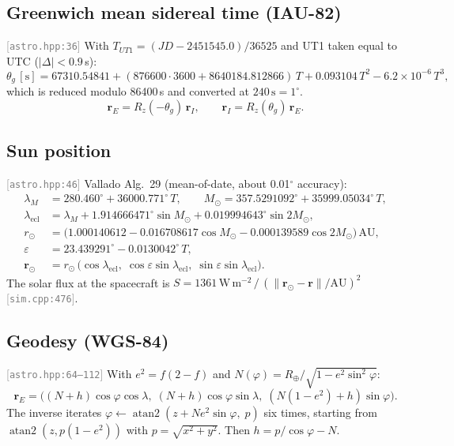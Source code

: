 \documentclass[11pt,a4paper]{article}
\newcommand{\vb}[1]{\boldsymbol{#1}}
\newcommand{\src}[1]{\textcolor{gray}{\small[\texttt{#1}]}}
\begin{document}
\subsection{Greenwich mean sidereal time (IAU-82)} \src{astro.hpp:36}
With $T_{UT1} = (JD - 2451545.0)/36525$ and UT1 taken equal to UTC ($|\Delta| < 0.9$\,s):
\begin{equation}
\theta_g\,[\mathrm{s}] = 67310.54841 + (876600\cdot3600 + 8640184.812866)\,T + 0.093104\,T^2 - 6.2\times10^{-6}\,T^3,
\end{equation}
which is reduced modulo 86400\,s and converted at $240\,\mathrm{s} = 1^\circ$.
\begin{equation}
\vb r_E = R_z(-\theta_g)\,\vb r_I, \qquad \vb r_I = R_z(\theta_g)\,\vb r_E .
\end{equation}

\subsection{Sun position} \src{astro.hpp:46}
Vallado Alg.~29 (mean-of-date, about 0.01$^\circ$ accuracy):
\begin{align}
\lambda_M &= 280.460^\circ + 36000.771^\circ\,T, \qquad
M_\odot = 357.5291092^\circ + 35999.05034^\circ\,T,\\
\lambda_{\text{ecl}} &= \lambda_M + 1.914666471^\circ\sin M_\odot + 0.019994643^\circ\sin 2M_\odot,\\
r_\odot &= \big(1.000140612 - 0.016708617\cos M_\odot - 0.000139589\cos 2M_\odot\big)\,\mathrm{AU},\\
\varepsilon &= 23.439291^\circ - 0.0130042^\circ\,T,\\
\vb r_\odot &= r_\odot\,\big(\cos\lambda_{\text{ecl}},\; \cos\varepsilon\sin\lambda_{\text{ecl}},\; \sin\varepsilon\sin\lambda_{\text{ecl}}\big).
\end{align}
The solar flux at the spacecraft is $S = 1361\,\mathrm{W\,m^{-2}}\,/\,(\lVert\vb r_\odot - \vb r\rVert/\mathrm{AU})^2$ \src{sim.cpp:476}.

\subsection{Geodesy (WGS-84)} \src{astro.hpp:64--112}
With $e^2 = f(2-f)$ and $N(\varphi) = R_\oplus/\sqrt{1 - e^2\sin^2\varphi}$:
\begin{equation}
\vb r_E = \big((N+h)\cos\varphi\cos\lambda,\; (N+h)\cos\varphi\sin\lambda,\; (N(1-e^2)+h)\sin\varphi\big).
\end{equation}
The inverse iterates $\varphi \leftarrow \operatorname{atan2}(z + N e^2\sin\varphi,\; p)$ six times, starting from $\operatorname{atan2}(z, p(1-e^2))$ with $p = \sqrt{x^2+y^2}$. Then $h = p/\cos\varphi - N$.
\end{document}
